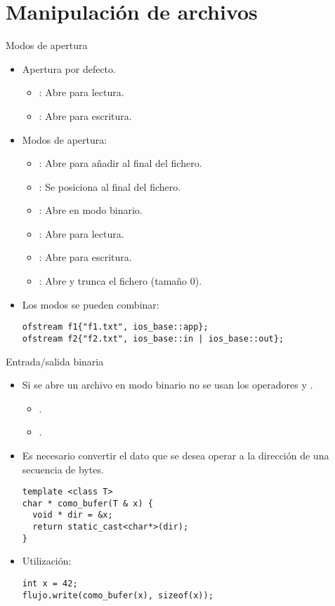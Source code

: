 \section{Manipulación de archivos}

\begin{frame}[fragile]{Modos de apertura}
\begin{itemize}
  \item Apertura por defecto.
    \begin{itemize}
      \item {}: Abre para lectura.
      \item {}: Abre para escritura.
    \end{itemize}
  \item Modos de apertura:
    \begin{itemize}
      \item {}: Abre para añadir al final del fichero.
      \item {}: Se posiciona al final del fichero.
      \item {}: Abre en modo binario.
      \item {}: Abre para lectura.
      \item {}: Abre para escritura.
      \item {}: Abre y trunca el fichero (tamaño 0).
    \end{itemize}
  \item Los modos se pueden combinar:
\begin{lstlisting}
ofstream f1{"f1.txt", ios_base::app};
ofstream f2{"f2.txt", ios_base::in | ios_base::out};
\end{lstlisting}
\end{itemize}
\end{frame}


\begin{frame}[fragile]{Entrada/salida binaria}
\begin{itemize}
  \item Si se abre un archivo en modo binario no se usan los operadores \cppid{<{}<} y \cppid{>{}>}.
    \begin{itemize}
      \item {}.
      \item {}.
    \end{itemize}
  \item Es necesario convertir el dato que se desea operar a la dirección de una secuencia de bytes.
\begin{lstlisting}
template <class T>
char * como_bufer(T & x) {
  void * dir = &x;
  return static_cast<char*>(dir);
}
\end{lstlisting}
  \item Utilización:
\begin{lstlisting}
int x = 42;
flujo.write(como_bufer(x), sizeof(x));
\end{lstlisting}
\end{itemize}
\end{frame}

